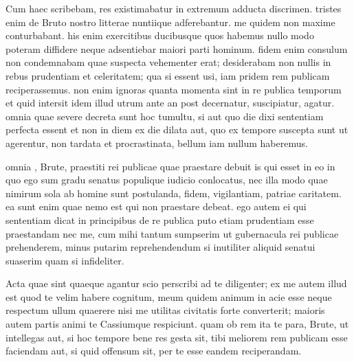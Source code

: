 


 Cum haec scribebam, res existimabatur in extremum adducta discrimen. tristes enim de Bruto nostro litterae nuntiique adferebantur. me quidem non maxime conturbabant. his enim exercitibus ducibusque quos habemus nullo modo poteram diffidere neque adsentiebar maiori parti hominum. fidem enim consulum non condemnabam quae suspecta vehementer erat; desiderabam non nullis in rebus prudentiam et celeritatem; qua si essent usi, iam pridem rem publicam reciperassemus. non enim ignoras quanta momenta sint in re publica temporum et quid intersit idem illud utrum ante an post decernatur, suscipiatur, agatur. omnia quae severe decreta sunt hoc tumultu, si aut quo die dixi sententiam perfecta essent et non in diem ex die dilata aut, quo ex tempore suscepta sunt ut agerentur, non tardata et procrastinata, bellum iam nullum haberemus.

 omnia , Brute, praestiti rei publicae quae praestare debuit is qui esset in eo in quo ego sum gradu senatus populique iudicio conlocatus, nec illa modo quae nimirum sola ab homine sunt postulanda, fidem, vigilantiam, patriae caritatem. ea sunt enim quae nemo est qui non praestare debeat. ego autem ei qui sententiam dicat in principibus de re publica puto etiam prudentiam esse praestandam nec me, cum mihi tantum sumpserim ut gubernacula rei publicae prehenderem, minus putarim reprehendendum si inutiliter aliquid senatui suaserim quam si infideliter.

 Acta quae sint quaeque agantur scio perscribi ad te diligenter; ex me autem illud est quod te velim habere cognitum, meum quidem animum in acie esse neque respectum ullum quaerere nisi me utilitas civitatis forte converterit; maioris autem partis animi te Cassiumque respiciunt. quam ob rem ita te para, Brute, ut intellegas aut, si hoc tempore bene res gesta sit, tibi meliorem rem publicam esse faciendam aut, si quid offensum sit, per te esse eandem reciperandam.

